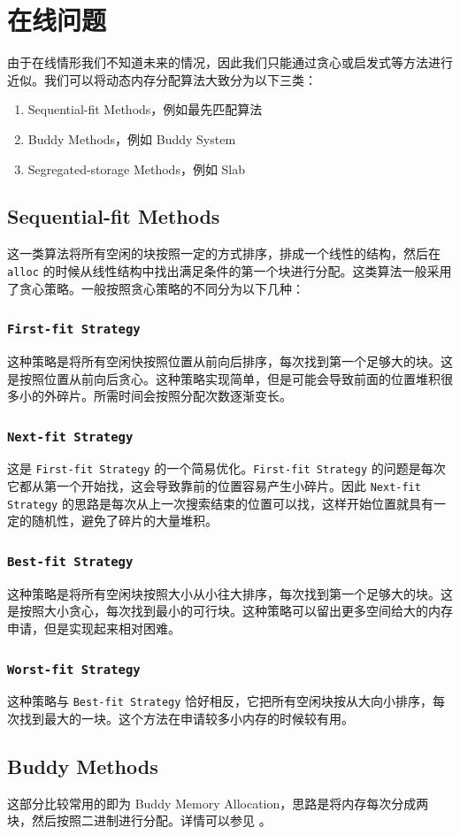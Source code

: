 \documentclass{noiassignment}
\begin{document}
	\section{在线问题}
	由于在线情形我们不知道未来的情况，因此我们只能通过贪心或启发式等方法进行近似。我们可以将动态内存分配算法大致分为以下三类：
	\begin{enumerate}
		\item Sequential-fit Methods，例如最先匹配算法
		\item Buddy Methods，例如 Buddy System
		\item Segregated-storage Methods，例如 Slab
	\end{enumerate}

	\subsection{Sequential-fit Methods}
	这一类算法将所有空闲的块按照一定的方式排序，排成一个线性的结构，然后在 \texttt{alloc} 的时候从线性结构中找出满足条件的第一个块进行分配。这类算法一般采用了贪心策略。一般按照贪心策略的不同分为以下几种：

	\subsubsection{\texttt{First-fit Strategy}}
	这种策略是将所有空闲快按照位置从前向后排序，每次找到第一个足够大的块。这是按照位置从前向后贪心。这种策略实现简单，但是可能会导致前面的位置堆积很多小的外碎片。所需时间会按照分配次数逐渐变长。

	\subsubsection{\texttt{Next-fit Strategy}}
	这是 \texttt{First-fit Strategy} 的一个简易优化。\texttt{First-fit Strategy} 的问题是每次它都从第一个开始找，这会导致靠前的位置容易产生小碎片。因此 \texttt{Next-fit Strategy} 的思路是每次从上一次搜索结束的位置可以找，这样开始位置就具有一定的随机性，避免了碎片的大量堆积。

	\subsubsection{\texttt{Best-fit Strategy}}
	这种策略是将所有空闲块按照大小从小往大排序，每次找到第一个足够大的块。这是按照大小贪心，每次找到最小的可行块。这种策略可以留出更多空间给大的内存申请，但是实现起来相对困难。

	\subsubsection{\texttt{Worst-fit Strategy}}
	这种策略与 \texttt{Best-fit Strategy} 恰好相反，它把所有空闲块按从大向小排序，每次找到最大的一块。这个方法在申请较多小内存的时候较有用。

	\subsection{Buddy Methods}
	这部分比较常用的即为 Buddy Memory Allocation，思路是将内存每次分成两块，然后按照二进制进行分配。详情可以参见 \cite{wiki:buddy}。

	\newpage

	
	
\end{document}
